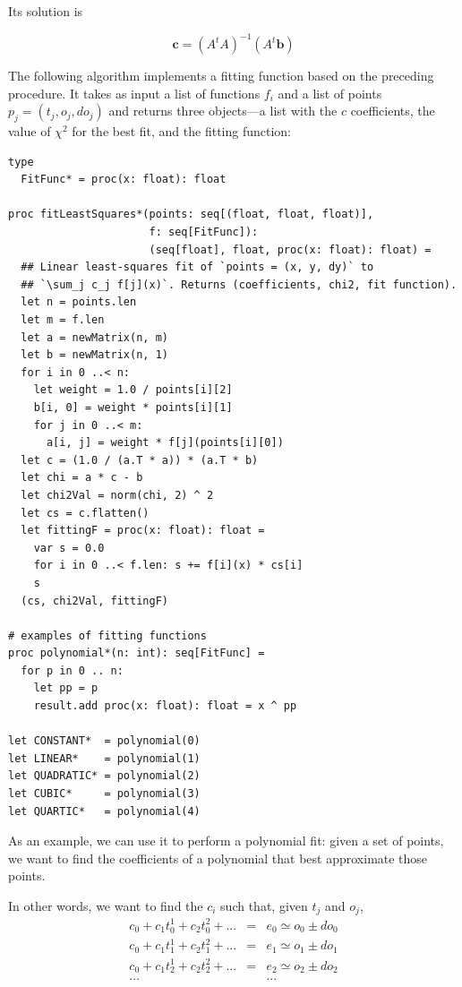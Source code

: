 \documentclass[justified, sixbynine]{tufte-book}
\def\ft{\small\tt}
\theoremstyle{plain}%
\newtheorem * {corollary}{Corollary}
\theoremstyle{definition}
\theoremstyle{remark}
\newtheorem * {remark}{Remark}
\newtheorem * {note}{Note}
\begin{document}
\begin{fullwidth}
Its solution is

\begin{equation}
\mathbf{c} = (A^t A)^{-1} (A^t \mathbf{b})
\end{equation}

The following algorithm implements a fitting function based on the preceding procedure. It takes as input a list of functions $f_i$ and a list of points $p_j=(t_j, o_j, do_j)$ and returns three objects---a list with the $c$ coefficients, the value of $\chi^2$ for the best fit, and the fitting function:

\begin{lstlisting}[caption={in file: {\ft nlib.nim}}]
type
  FitFunc* = proc(x: float): float

proc fitLeastSquares*(points: seq[(float, float, float)],
                      f: seq[FitFunc]):
                      (seq[float], float, proc(x: float): float) =
  ## Linear least-squares fit of `points = (x, y, dy)` to
  ## `\sum_j c_j f[j](x)`. Returns (coefficients, chi2, fit function).
  let n = points.len
  let m = f.len
  let a = newMatrix(n, m)
  let b = newMatrix(n, 1)
  for i in 0 ..< n:
    let weight = 1.0 / points[i][2]
    b[i, 0] = weight * points[i][1]
    for j in 0 ..< m:
      a[i, j] = weight * f[j](points[i][0])
  let c = (1.0 / (a.T * a)) * (a.T * b)
  let chi = a * c - b
  let chi2Val = norm(chi, 2) ^ 2
  let cs = c.flatten()
  let fittingF = proc(x: float): float =
    var s = 0.0
    for i in 0 ..< f.len: s += f[i](x) * cs[i]
    s
  (cs, chi2Val, fittingF)

# examples of fitting functions
proc polynomial*(n: int): seq[FitFunc] =
  for p in 0 .. n:
    let pp = p
    result.add proc(x: float): float = x ^ pp

let CONSTANT*  = polynomial(0)
let LINEAR*    = polynomial(1)
let QUADRATIC* = polynomial(2)
let CUBIC*     = polynomial(3)
let QUARTIC*   = polynomial(4)
\end{lstlisting}

As an example, we can use it to perform a polynomial fit: given a set of points, we want to find the coefficients of a polynomial that best approximate those points.

In other words, we want to find the $c_i$ such that, given $t_j$ and $o_j$, 
\begin{eqnarray}
c_0  + c_1 t_0^{1} + c_2 t_0^{2} +  ... & = & e_0 \simeq o_0 \pm do_0 \\
c_0  + c_1 t_1^{1} + c_2 t_1^{2} +  ... & = & e_1 \simeq o_1 \pm do_1\\
c_0  + c_1 t_2^{1} + c_2 t_2^{2} +  ... & = & e_2 \simeq o_2 \pm do_2\\
... &  &... \\
\end{eqnarray}


\end{fullwidth}
\end{document}
